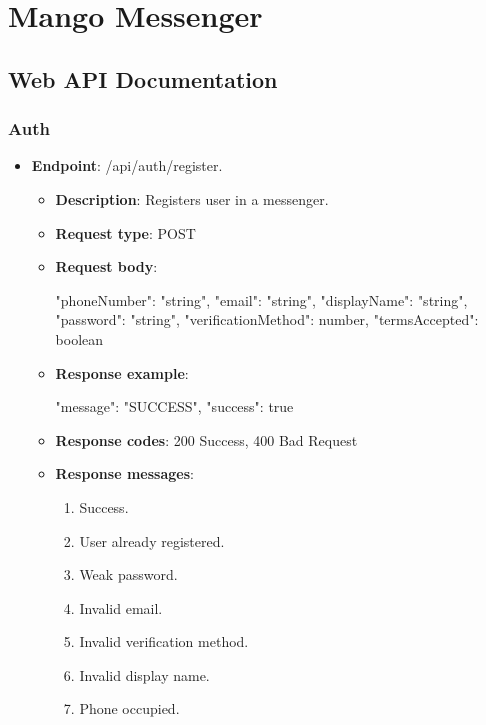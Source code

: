 \chapter{Mango Messenger}\label{ch:mango-messenger}


\section{Web API Documentation}\label{sec:web-api-documentation}

\subsection{Auth}\label{subsec:auth}
\begin{itemize}
    \item \textbf{Endpoint}: /api/auth/register.
    \begin{itemize}
        \item \textbf{Description}: Registers user in a messenger.
        \item \textbf{Request type}: POST
        \item \textbf{Request body}:
        \begin{spverbatim}
        {
            "phoneNumber": "string",
            "email": "string",
            "displayName": "string",
            "password": "string",
            "verificationMethod": number,
            "termsAccepted": boolean
        }
        \end{spverbatim}
        \item  \textbf{Response example}:
        \begin{spverbatim}
        {
            "message": "SUCCESS",
            "success": true
        }
        \end{spverbatim}
        \item \textbf{Response codes}: 200 Success, 400 Bad Request
        \item \textbf{Response messages}:
        \begin{enumerate}
            \item Success.
            \item User already registered.
            \item Weak password.
            \item Invalid email.
            \item Invalid verification method.
            \item Invalid display name.
            \item Phone occupied.
        \end{enumerate}
    \end{itemize}


\end{itemize}
